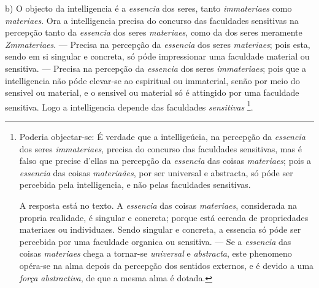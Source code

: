 b) O objecto da intelligencia é a \emph{essencia} dos seres, tanto \emph{immateriaes} como \emph{materiaes}. Ora a intelligencia precisa do concurso das faculdades sensitivas na percepção tanto da \emph{essencia} dos seres \emph{materiaes}, como da dos seres meramente \emph{Zmmateriaes}. --- Precisa na percepção da \emph{essencia} dos seres \emph{materiaes}; pois esta, sendo em si singular e concreta, só póde impressionar uma faculdade material ou sensitiva. --- Precisa na percepção da \emph{essencia} dos seres \emph{immateriaes}; pois que a intelligencia não póde elevar-se ao espiritual ou immaterial, senão por meio do sensivel ou material, e o sensivel ou material só é attingido por uma faculdade sensitiva. Logo a intelligencia depende das faculdades \emph{sensitivas} \footnote{Poderia objectar-se: É verdade que a intelligeúcia, na percepção da \emph{essencia} dos seres \emph{immateriaes}, precisa do concurso das faculdades sensitivas, mas é falso que precise d'ellas na percepção da \emph{essencia} das coisas \emph{materiaes}; pois a \emph{essencia} das coisas \emph{materiaães}, por ser universal e abstracta, só póde ser percebida pela intelligencia, e não pelas faculdades sensitivas.\par A resposta está no texto. A \emph{essencia} das coisas \emph{materiaes}, considerada na propria realidade, é singular e concreta; porque está cercada de propriedades materiaes ou individuaes. Sendo singular e concreta, a essencia só póde ser percebida por uma faculdade organica ou sensitiva. --- Se a \emph{essencia} das coisas \emph{materiaes} chega a tornar-se \emph{universal} e \emph{abstracta}, este phenomeno opéra-se na alma depois da percepção dos sentidos externos, e é devido a uma \emph{força abstractiva}, de que a mesma alma é dotada.}.

